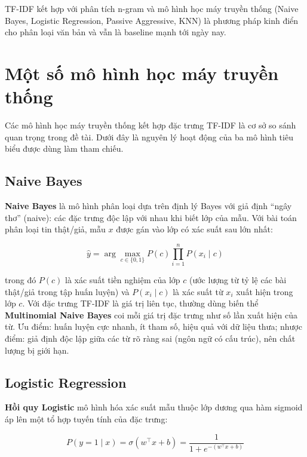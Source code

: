 TF-IDF kết hợp với phân tích n-gram và mô hình học máy truyền thống (Naive Bayes, Logistic Regression, Passive Aggressive, KNN) là phương pháp kinh điển cho phân loại văn bản và vẫn là baseline mạnh tới ngày nay.

\section{Một số mô hình học máy truyền thống}

Các mô hình học máy truyền thống kết hợp đặc trưng TF-IDF là cơ sở so sánh quan trọng trong đề tài. Dưới đây là nguyên lý hoạt động của ba mô hình tiêu biểu được dùng làm tham chiếu.

\subsection{Naive Bayes}

\textbf{Naive Bayes} là mô hình phân loại dựa trên định lý Bayes với giả định ``ngây thơ'' (naive): các đặc trưng độc lập với nhau khi biết lớp của mẫu. Với bài toán phân loại tin thật/giả, mẫu $x$ được gán vào lớp có xác suất sau lớn nhất:

\begin{equation}
    \hat{y} = \arg\max_{c \in \{0, 1\}} P(c) \prod_{i=1}^{n} P(x_i \mid c)
    \label{eq:nb}
\end{equation}

trong đó $P(c)$ là xác suất tiền nghiệm của lớp $c$ (ước lượng từ tỷ lệ các bài thật/giả trong tập huấn luyện) và $P(x_i \mid c)$ là xác suất từ $x_i$ xuất hiện trong lớp $c$. Với đặc trưng TF-IDF là giá trị liên tục, thường dùng biến thể \textbf{Multinomial Naive Bayes} coi mỗi giá trị đặc trưng như số lần xuất hiện của từ. Ưu điểm: huấn luyện cực nhanh, ít tham số, hiệu quả với dữ liệu thưa; nhược điểm: giả định độc lập giữa các từ rõ ràng sai (ngôn ngữ có cấu trúc), nên chất lượng bị giới hạn.

\subsection{Logistic Regression}

\textbf{Hồi quy Logistic} mô hình hóa xác suất mẫu thuộc lớp dương qua hàm sigmoid áp lên một tổ hợp tuyến tính của đặc trưng:

\begin{equation}
    P(y = 1 \mid x) = \sigma(w^{\top} x + b) = \frac{1}{1 + e^{-(w^{\top}x + b)}}
    \label{eq:lr}
\end{equation}

